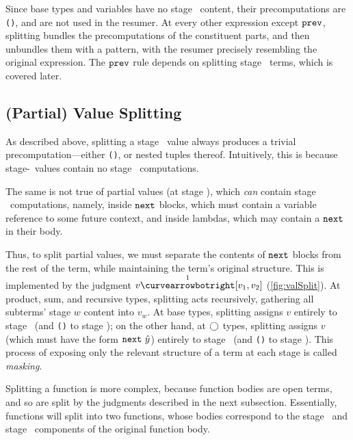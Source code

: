 Since base types and variables have no stage \bbone\ content, their
precomputations are \texttt{()}, and are not used in the resumer. At every other
expression except ${\tt prev}$, splitting bundles the precomputations of the
constituent parts, and then unbundles them with a pattern, with the resumer
precisely resembling the original expression. The ${\tt prev}$ rule depends on
splitting stage \bbone\ terms, which is covered later.


\subsection{(Partial) Value Splitting}

As described above, splitting a stage \bbtwo\ value always produces a trivial
precomputation---either \texttt{()}, or nested tuples thereof. Intuitively,
this is because stage-\bbtwo\ values contain no stage \bbone\ computations.

The same is not true of partial values (at stage \bbone), which \emph{can}
contain stage \bbtwo\ computations, namely, inside ${\tt next}$ blocks, which must
contain a variable reference to some future context, and inside lambdas, which
may contain a ${\tt next}$ in their body.

Thus, to split partial values, we must separate the contents of ${\tt next}$ blocks
from the rest of the term, while maintaining the term's original structure. This
is implemented by the judgment $v \vsplito [v_1,v_2]$ (\ref{fig:valSplit}).
At product, sum, and recursive types, splitting acts recursively, gathering all
subterms' stage $w$ content into $v_w$.
At base types, splitting assigns $v$ entirely to stage \bbone\ (and \texttt{()}
to stage \bbtwo);
on the other hand, at $\bigcirc$ types, splitting assigns $v$ (which must have the
form ${\tt next}~\hat y$) entirely to stage \bbtwo\ (and \texttt{()} to stage
\bbone).
This process of exposing only the relevant structure of a term at each stage is
called \emph{masking}.

Splitting a function is more complex, because function bodies are open terms,
and so are split by the judgments described in the next subsection. Essentially,
functions will split into two functions, whose bodies correspond to the stage
\bbone\ and stage \bbtwo\ components of the original function body.


